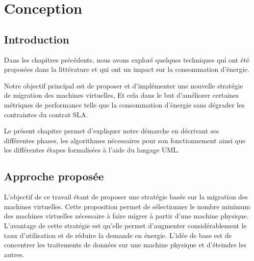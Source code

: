
\chapter{Conception}
\vspace{3cm}
\minitoc
\clearpage

\label{Chapitre3}


\section{Introduction}

\begin{onehalfspace}

\lettrine[nindent=1em,lines=3]{D}ans les chapitres précédents, nous avons exploré quelques techniques qui ont été proposées dans la littérature et qui ont un impact sur la consommation d'énergie.\medskip

Notre objectif principal est de proposer et d'implémenter une nouvelle stratégie de migration des machines virtuelles, Et cela dans le but d'améliorer certaines métriques de performance telle que la consommation d'énergie sans dégrader les contraintes du contrat SLA.\medskip

Le présent chapitre permet d'expliquer notre démarche en décrivant ses différentes phases, les algorithmes nécessaires pour son fonctionnement ainsi que les différentes étapes formalisées à l'aide du langage UML.
\end{onehalfspace}

\section{Approche proposée}
\begin{onehalfspace}
L’objectif de ce travail étant de proposer une stratégie basée sur la migration des machines virtuelles. Cette proposition permet de sélectionner le nombre minimum des machines virtuelles nécessaire à faire migrer à partir d’une machine physique.
L’avantage de cette stratégie est qu’elle permet d’augmenter considérablement le taux d’utilisation et de réduire la demande en énergie. L’idée de base est de concentrer les traitements de données sur une machine physique et d’éteindre les autres.

\end{onehalfspace}


